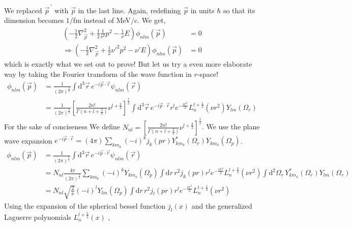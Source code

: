 \documentclass[10pt]{article}
\begin{document}
We replaced $\vec{p}^{\, \prime}$ with $\vec{p}$ in the last line. Again, redefining $\vec{p}$ in units $\hbar$ so that its dimension becomes $1/$fm instead of MeV/c. We get,
\begin{align*}
	\left(-\frac{1}{2}  \nabla^{2}_{\vec{p}} + \frac{1}{2} \frac{1}{\nu^{2}} p^{2} - \frac{1}{\nu} E  \right)  \phi_{n l m}(\vec{p}) &= 0 \\
\Rightarrow \left(-\frac{1}{2}  \nabla^{2}_{\vec{p}} + \frac{1}{2} \nu'^{2} p^{2} - \nu' E  \right)  \phi_{n l m}(\vec{p}) &= 0
\end{align*}
which is exactly what we set out to prove!
But let us try a even more elaborate way by taking the Fourier transform of the wave function in $r$-space!
\begin{align*}
	\phi_{n l m}(\vec{p}) &= \frac{1}{(2 \pi)^{\frac{3}{2}}}\int \text{d}^{3} \vec{r} \, e^{- i \vec{p} \cdot \vec{r}} \psi_{n l m}(\vec{r})\\
	&= \frac{1}{(2 \pi)^{\frac{3}{2}}} \left[ \frac{ 2n!}{\Gamma(n+l+\frac{3}{2})} \nu^{l+\frac{3}{2}} \right]^{\frac{1}{2}} \int \text{d}^{3} \vec{r} \,  e^{- i \vec{p} \cdot \vec{r}} r^{l} e^{-\frac{\nu r^{2}}{2}} L_{n}^{l+\frac{1}{2}}( \nu r^{2}) Y_{l m}(\Omega_{r})
\end{align*}
For the sake of conciseness We define $N_{nl} = \left[ \frac{ 2n!}{\Gamma(n+l+\frac{3}{2})} \nu^{l+\frac{3}{2}} \right]^{\frac{1}{2}}$. We use the plane wave expansion $ e^{- i \vec{p} \cdot \vec{r}} = (4 \pi) \sum_{k m_k} (-i)^{k} j_{k}( p r) Y_{k m_k}^{*}(\Omega_r) Y_{k m_k}(\Omega_p)$.
\begin{align*}
	\phi_{n l m}(\vec{p}) &= \frac{1}{(2 \pi)^{\frac{3}{2}}} \int \text{d}^{3} \vec{r} \, e^{- i \vec{p} \cdot \vec{r}} \psi_{n l m}(\vec{r})\\
	&=  N_{nl} \frac{4 \pi}{(2 \pi)^{\frac{3}{2}}} \sum_{k m_k} (-i)^{k}  Y_{k m_k}(\Omega_p) \int \text{d}r \, r^{2} j_{k}( p r) r^{l}  e^{-\frac{\nu r^{2}}{2}} L_{n}^{l+\frac{1}{2}}( \nu r^{2}) \int \text{d}^{2} \Omega_{r} \, Y_{k m_k}^{*}(\Omega_r) Y_{l m}(\Omega_{r}) \\
	&= N_{nl} \sqrt{ \frac{2}{\pi}} (-i)^{l}  Y_{l m}(\Omega_p) \int \text{d}r \, r^{2} j_{l}( p r) r^{l}  e^{-\frac{\nu r^{2}}{2}} L_{n}^{l+\frac{1}{2}}( \nu r^{2}) 
\end{align*}
Using the expansion of the spherical bessel function $j_l(x)$ and the generalized Laguerre polynomials $L_{n}^{l+\frac{1}{2}}(x)$ ,
\end{document}
